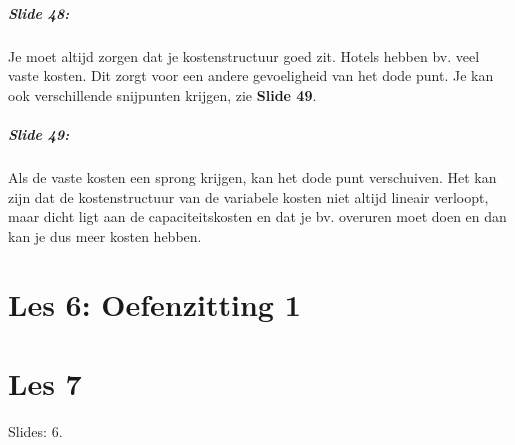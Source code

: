 \documentclass[10pt,a4paper]{report}
\begin{document}
\paragraph{Slide 48:} Je moet altijd zorgen dat je kostenstructuur goed zit. Hotels hebben bv. veel vaste kosten. Dit zorgt voor een andere gevoeligheid van het dode punt. Je kan ook verschillende snijpunten krijgen, zie \textbf{Slide 49}.

\paragraph{Slide 49:} Als de vaste kosten een sprong krijgen, kan het dode punt verschuiven. Het kan zijn dat de kostenstructuur van de variabele kosten niet altijd lineair verloopt, maar dicht ligt aan de capaciteitskosten en dat je bv. overuren moet doen en dan kan je dus meer kosten hebben.

\chapter{Les 6: Oefenzitting 1}


\chapter{Les 7}

Slides: 6.
\end{document}
